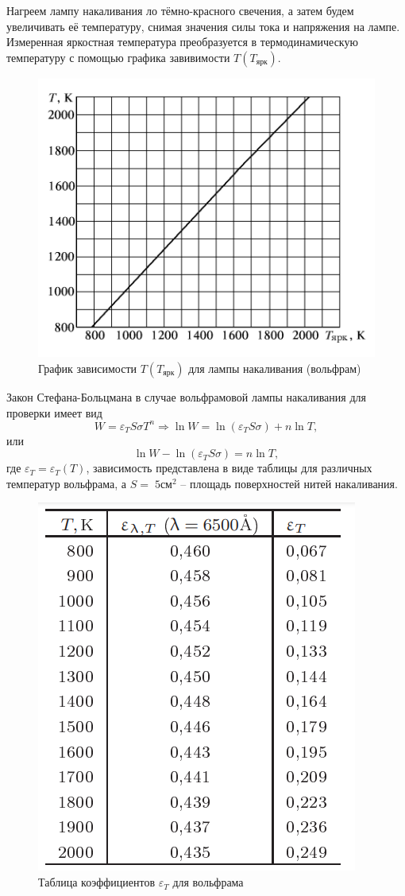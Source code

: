     Нагреем лампу накаливания ло тёмно-красного свечения, а затем будем увеличивать её температуру, снимая значения силы тока и напряжения на лампе. Измеренная яркостная температура преобразуется в термодинамическую температуру с помощью графика завивимости $T(T_{\text{ярк}})$. 

    \begin{figure}[h!]
        \centering
        \includegraphics[width = 11 cm]{images/wolfram_tempr}
        \caption{График зависимости $T(T_{\text{ярк}})$ для лампы накаливания (вольфрам)}
        \label{}
    \end{figure}

    Закон Стефана-Больцмана в случае вольфрамовой лампы накаливания для проверки имеет вид
    \begin{equation}
        W = \varepsilon_T S \sigma T^n \Rightarrow \ln W = \ln (\varepsilon_T S \sigma) + n \ln T,
    \end{equation}
    или
    \begin{equation}
        \ln W - \ln (\varepsilon_T S \sigma) = n \ln T,
    \end{equation}
    где $\varepsilon_T = \varepsilon_T (T)$, зависимость представлена в виде таблицы для различных температур вольфрама, а $S = \; 5 \text{см}^2$ -- площадь поверхностей нитей накаливания.

    \begin{figure}[h!]
        \centering
        \includegraphics[width = 6.5 cm]{images/wolfram_coef}
        \caption{Таблица коэффициентов $\varepsilon_T$ для вольфрама}
        \label{}
    \end{figure}


